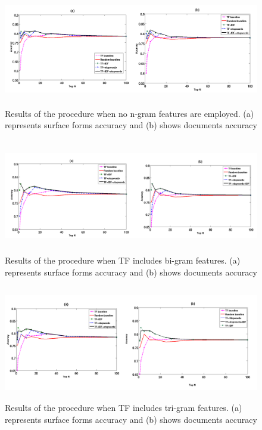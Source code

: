 \documentclass[runningheads,a4paper]{llncs}
\begin{document}
\begin{figure}
\centering
\includegraphics[height=5cm, width=12.5cm]{normal}
\caption{Results of the procedure when no n-gram features are employed. (a) represents surface forms accuracy and (b) shows documents accuracy}
\label{fig1}
\end{figure}
\begin{figure}
\centering
\includegraphics[height=5cm, width=12.5cm]{bigrams}
\caption{Results of the procedure when TF includes bi-gram features. (a) represents surface forms accuracy and (b) shows documents accuracy}
\label{fig1}
\end{figure}
\begin{figure}
\centering
\includegraphics[height=5cm, width=12.5cm]{trigrams}
\caption{Results of the procedure when TF includes tri-gram features. (a) represents surface forms accuracy and (b) shows documents accuracy}
\label{fig1}
\end{figure}
\end{document}
